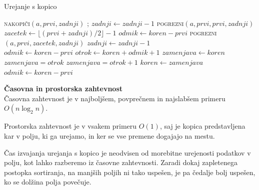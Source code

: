 \documentclass[a4paper,oneside,12pt]{article}
\newcommand{\subsubsubsection}[1]{\vspace*{1ex}\textbf{#1}\\}
\begin{document}
\begin{algorithm}
  \caption{Urejanje s kopico}\label{algo:heapsort}
  \begin{algorithmic}[1]
        \State \textsc{nakopiči}$(a, prvi, zadnji)$
            ;
            \State $zadnji \gets zadnji - 1$
            \State \textsc{pogrezni}$(a, prvi, prvi, zadnji)$
        \EndWhile
    \EndFunction
    \\
        \State $zacetek \gets \lfloor(prvi + zadnji) / 2\rfloor - 1$
         
            \State $odmik \gets koren - prvi$
            \State \textsc{pogrezni}$(a, prvi, zacetek, zadnji)$
            \State $zadnji \gets zadnji - 1$
        \EndWhile
    \EndFunction
    \\
        \State $odmik \gets koren - prvi$
         
            \State $otrok \gets koren + odmik + 1$
            \State $zamenjava \gets koren$ 
             
            \State $zamenjava = otrok$
            \EndIf {}
                \State $zamenjava = otrok + 1$
            \EndIf
                \State $koren \gets zamenjava$
                \State $odmik \gets koren - prvi$
            \Else
                \State \Return 
            \EndIf
        \EndWhile
    \EndFunction
  \end{algorithmic}
\end{algorithm}

\subsubsubsection{Časovna in prostorska zahtevnost}
Časovna zahtevnost je v najboljšem, povprečnem in najslabšem primeru $O(n\log_2 n)$.

Prostorska zahtevnost je v vsakem primeru $O(1)$, saj je kopica predstavljena kar v
polju, ki ga urejamo, in ker se vse premene dogajajo na mestu.

Čas izvajanja urejanja s kopico je neodvisen od morebitne urejenosti podatkov v polju,
kot lahko razberemo iz časovne zahtevnosti. Zaradi dokaj zapletenega postopka sortiranja,
na manjših poljih ni tako uspešen, je pa čedalje bolj uspešen, ko se dolžina polja
povečuje.
\end{document}
